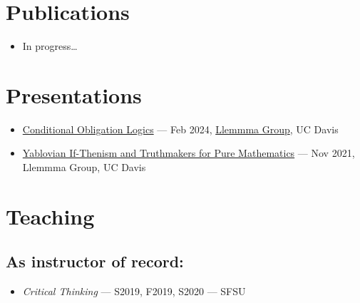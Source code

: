 \documentclass{article}
\begin{document}

\section*{Publications}
\begin{itemize}
    \item In progress\ldots
\end{itemize}


\section*{Presentations}
\begin{itemize}
    \item \href{https://bphopkins.github.io/documents/Hopkins%20-%20Conditional%20Obligation%20Logics.pdf}{Conditional Obligation Logics} --- Feb 2024, \href{https://llemmma.wordpress.com/}{Llemmma Group}, UC Davis
    \item \href{https://bphopkins.github.io/documents/Hopkins%20-%20Yablovian%20If-Thenism%20and%20Pure%20Mathematics.pdf}{Yablovian If-Thenism and Truthmakers for Pure Mathematics} --- Nov 2021, Llemmma Group, UC Davis
\end{itemize}


\section*{Teaching}
\subsection*{As instructor of record:}
\begin{itemize}
    \item \textit{Critical Thinking} --- S2019, F2019, S2020 --- SFSU
\end{itemize}
\end{document}
